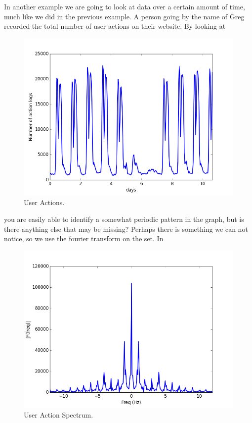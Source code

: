 \documentclass [../article.tex]{subfiles}
\begin{document}
	In another example we are going to look at data over a certain
  amount of time, much like we did in the previous example. A
  person going by the name of Greg recorded the total number of
  user actions on their website. By looking at
  \begin{figure}[h!]
    \includegraphics[width=\linewidth]{../img/evar/5.png}
    \caption{User Actions.}
    \label{fig:useractions}
  \end{figure}
  you are easily able to identify a somewhat periodic pattern in
  the graph, but is there anything else that may be missing?
  Perhaps there is something we can not notice, so we use the
  fourier transform on the set. In
  \begin{figure}[h!]
    \includegraphics[width=\linewidth]{../img/evar/6.png}
    \caption{User Action Spectrum.}
    \label{fig:actionspectrum}
  \end{figure}
\end{document}
